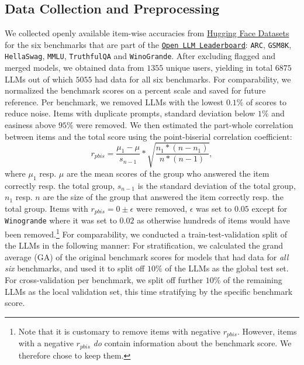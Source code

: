 \documentclass{article}
\begin{document}
\subsection{Data Collection and Preprocessing}
We collected openly available item-wise accuracies from \href{https://huggingface.co/datasets}{Hugging Face Datasets} for the six benchmarks that are part of the \href{https://huggingface.co/open-llm-leaderboard}{\texttt{Open LLM Leaderboard}}: \texttt{ARC}, \texttt{GSM8K}, \texttt{HellaSwag}, \texttt{MMLU}, \texttt{TruthfulQA} and \texttt{WinoGrande}. %
After excluding flagged and merged models, we obtained data from $1355$ unique users, yielding in total $6875$ LLMs out of which $5055$ had data for all six benchmarks. 
For comparability, we normalized the benchmark scores on a percent scale and saved for future reference. Per benchmark, we removed LLMs with the lowest $0.1\%$ of scores to reduce noise.
Items with duplicate prompts, standard deviation below $1\%$ and easiness above $95\%$ were removed. We then estimated the part-whole correlation between  items and the total score using the point-biserial correlation coefficient:
\begin{equation}
   r_{pbis} = \frac{\mu_1 - \mu}{s_{n-1}} * \sqrt{\frac{n_1 * (n-n_1)}{n*(n-1)}},
\end{equation}
where $\mu_1$ resp. $\mu$ are the mean scores of the group who answered the item correctly resp. the total group, $s_{n-1}$ is the standard deviation of the total group, $n_1$ resp. $n$ are the size of the group that answered the item correctly resp. the total group. Items with $r_{pbis} = 0 \pm \epsilon$ were removed, $\epsilon$ was set to $0.05$ except for \texttt{Winogrande} where it was set to $0.02$ as otherwise hundreds of items would have been removed.\footnote{Note that it is customary to remove items with negative $r_{pbis}$. However, items with a negative $r_{pbis}$ \textit{do} contain information about the benchmark score. We therefore chose to keep them.}
For comparability, we conducted a train-test-validation split of the LLMs in the following manner: For stratification, we calculated the grand average (GA) of the original benchmark scores for models that had data for \textit{all six} benchmarks, and used it to split off $10\%$ of the LLMs as the global test set. For cross-validation per benchmark, we split off further $10\%$ of the remaining LLMs as the local validation set, this time stratifying by the specific benchmark score. 
\end{document}
